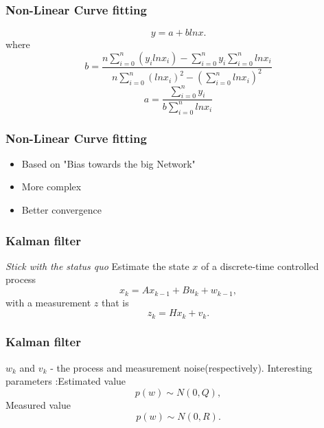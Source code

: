 \documentclass[t]{beamer}
\begin{document}
\begin{frame}
\frametitle{Non-Linear Curve fitting}
\begin{equation}
y= a + blnx.
\end{equation}
where
\begin{equation}
 b = \frac{n\sum_{i=0}^n{(y_ilnx_i)}-\sum_{i=0}^n{y_i\sum_{i=0}^n{lnx_i}}}{n\sum_{i=0}^n{(lnx_i)^2}-(\sum_{i=0}^n{lnx_i})^2}
\end{equation}
\begin{equation}
 a = \frac{\sum_{i=0}^n y_i}{b\sum_{i=0}^n{ln x_i}}
\end{equation}
\end{frame}
\begin{frame}
\frametitle{Non-Linear Curve fitting}
\begin{itemize}
\item Based on "Bias towards the big Network" \newline
\item More complex \newline
\item Better convergence \newline
\end{itemize}
\end{frame}
\begin{frame}
\frametitle{Kalman filter} \textit{Stick with the status quo}
\newline Estimate the state $x$ of a discrete-time controlled process
\begin{equation}
 x_k = Ax_{k-1} + Bu_k + w_{k-1} ,
\end{equation}
with a measurement $z$ that is
\begin{equation}
 z_k = Hx_k + v_k.
\end{equation}
\end{frame}
\begin{frame}
\frametitle{Kalman filter}
 $w_k$ and $v_k$ - the process and
measurement noise(respectively).
\newline \newline
Interesting parameters :\newline \newline Estimated value
\begin{equation}
 p(w)\sim N(0,Q),
\end{equation}\newline
Measured value
\begin{equation}
 p(w)\sim N(0,R).
\end{equation}
\end{frame}
\end{document}
